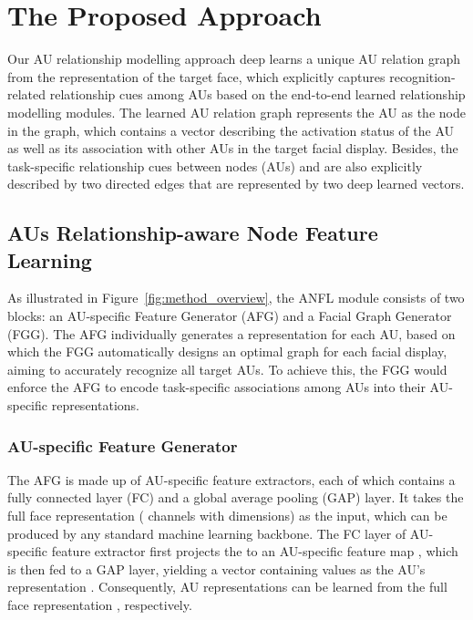 \documentclass{article}
\begin{document}
\section{The Proposed Approach}


\noindent Our AU relationship modelling approach deep learns a unique AU relation graph from the representation of the target face, which explicitly captures recognition-related relationship cues among AUs based on the end-to-end learned relationship modelling modules. The learned AU relation graph represents the  AU as the node  in the graph, which contains a vector describing the activation status of the  AU as well as its association with other AUs in the target facial display. Besides, the task-specific relationship cues between nodes (AUs)  and  are also explicitly described by two directed edges  that are represented by two deep learned vectors.






\subsection{AUs Relationship-aware Node Feature Learning}
\label{subsec: node_feature}




\noindent As illustrated in Figure~\ref{fig:method_overview}, the ANFL module consists of two blocks: an AU-specific Feature Generator (AFG) and a Facial Graph Generator (FGG). The AFG individually generates a representation for each AU, based on which the FGG automatically designs an optimal graph for each facial display, aiming to accurately recognize all target AUs. To achieve this, the FGG would enforce the AFG to encode task-specific associations among AUs into their AU-specific representations.


\subsubsection{AU-specific Feature Generator} 

The AFG is made up of  AU-specific feature extractors, each of which contains a fully connected layer (FC) and a global average pooling (GAP) layer. It takes the full face representation  ( channels with  dimensions) as the input, which can be produced by any standard machine learning backbone. The FC layer of  AU-specific feature extractor first projects the  to an AU-specific feature map , which is then fed to a GAP layer, yielding a vector containing  values as the  AU's representation . Consequently,  AU representations can be learned from the full face representation , respectively.
\end{document}
